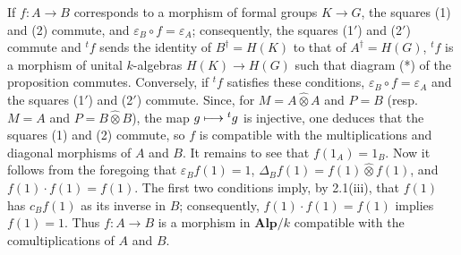 If $f:A\to B$ corresponds to a morphism of formal groups $K\to G$, the squares (1) and (2) commute, and $\varepsilon_B\circ f=\varepsilon_A$; consequently, the squares (1$'$) and (2$'$) commute and ${}^t f$ sends the identity of $B^\dagger=H(K)$ to that of $A^\dagger=H(G)$, \ie ${}^t f$ is a morphism of unital $k$-algebras $H(K)\to H(G)$ such that diagram (*) of the proposition commutes.
Conversely, if ${}^t f$ satisfies these conditions, $\varepsilon_B\circ f=\varepsilon_A$ and the squares (1$'$) and (2$'$) commute. Since, for $M=A\widehat\otimes A$ and $P=B$ (resp. $M=A$ and $P=B\widehat\otimes B$), the map $g\longmapsto{}^t g$ is injective, one deduces that the squares (1) and (2) commute, so $f$ is compatible with the multiplications and diagonal morphisms of $A$ and $B$. It remains to see that $f(1_A)=1_B$. Now it follows from the foregoing that $\varepsilon_Bf(1)=1$, $\Delta_Bf(1)=f(1)\widehat\otimes f(1)$, and $f(1)\cdot f(1)=f(1)$. The first two conditions imply, by 2.1(iii), that $f(1)$ has $c_Bf(1)$ as its inverse in $B$; consequently, $f(1)\cdot f(1)=f(1)$ implies $f(1)=1$. Thus $f:A\to B$ is a morphism in $\mathbf{Alp}/k$ compatible with the comultiplications of $A$ and $B$.

